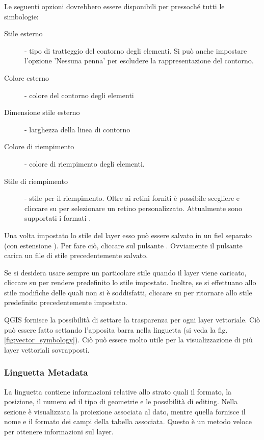 Le seguenti opzioni dovrebbero essere disponibili per pressoché tutti le
simbologie:
\begin{description}
 \item[Stile esterno] - tipo di tratteggio del contorno degli elementi. Si può
 anche impostare l'opzione 'Nessuna penna' per escludere la rappresentazione
 del contorno.
 \item[Colore esterno] - colore del contorno degli elementi
 \item[Dimensione stile esterno] - larghezza della linea di contorno
 \item[Colore di riempimento] - colore di riempimento degli elementi.
 \item[Stile di riempimento] - stile per il riempimento. Oltre ai retini forniti è possibile scegliere  e cliccare su \browsebutton per selezionare un retino personalizzato. Attualmente sono supportati i formati .
\end{description}

Una volta impostato lo stile del layer esso può essere salvato in un fiel
separato (con estensione ).
Per fare ciò, cliccare sul pulsante . Ovviamente il
pulsante  carica un file di stile precedentemente
salvato.

Se si desidera usare sempre un particolare stile quando il layer viene
caricato, cliccare su  per rendere predefinito
lo stile impostato. Inoltre, se si effettuano allo stile modifiche delle quali
non si è soddisfatti, cliccare su  per
ritornare allo stile predefinito precedentemente impostato.

 \label{sec:vect_transparency} 
QGIS \CURRENT fornisce la possibilità di settare la trasparenza per ogni layer
vettoriale. Ciò può essere fatto settando l'apposita barra
 nella linguetta  (si veda la fig. \ref{fig:vector_symbology}).
Ciò può essere molto utile per la visualizzazione di più layer vettoriali
sovrapposti.

\subsubsection{Linguetta Metadata}

La linguetta  contiene informazioni relative allo strato quali il formato, la posizione, il
numero ed il tipo di geometrie e le possibilità di editing. Nella sezione
 è visualizzata la proiezione associata al
dato, mentre quella  fornisce il nome
e il formato dei campi della tabella associata. Questo è un metodo veloce per
ottenere informazioni sul layer.

